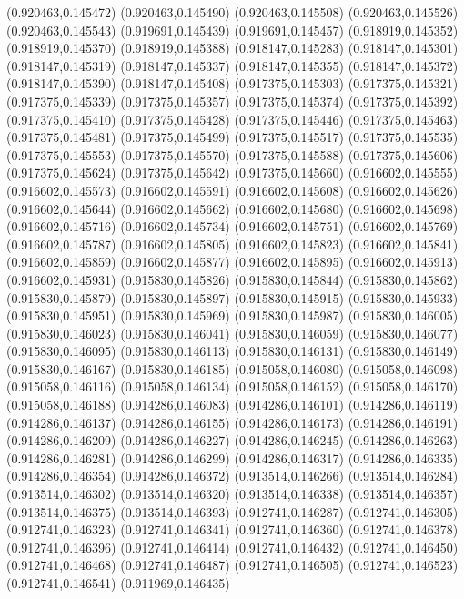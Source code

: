 (0.920463,0.145472)
(0.920463,0.145490)
(0.920463,0.145508)
(0.920463,0.145526)
(0.920463,0.145543)
(0.919691,0.145439)
(0.919691,0.145457)
(0.918919,0.145352)
(0.918919,0.145370)
(0.918919,0.145388)
(0.918147,0.145283)
(0.918147,0.145301)
(0.918147,0.145319)
(0.918147,0.145337)
(0.918147,0.145355)
(0.918147,0.145372)
(0.918147,0.145390)
(0.918147,0.145408)
(0.917375,0.145303)
(0.917375,0.145321)
(0.917375,0.145339)
(0.917375,0.145357)
(0.917375,0.145374)
(0.917375,0.145392)
(0.917375,0.145410)
(0.917375,0.145428)
(0.917375,0.145446)
(0.917375,0.145463)
(0.917375,0.145481)
(0.917375,0.145499)
(0.917375,0.145517)
(0.917375,0.145535)
(0.917375,0.145553)
(0.917375,0.145570)
(0.917375,0.145588)
(0.917375,0.145606)
(0.917375,0.145624)
(0.917375,0.145642)
(0.917375,0.145660)
(0.916602,0.145555)
(0.916602,0.145573)
(0.916602,0.145591)
(0.916602,0.145608)
(0.916602,0.145626)
(0.916602,0.145644)
(0.916602,0.145662)
(0.916602,0.145680)
(0.916602,0.145698)
(0.916602,0.145716)
(0.916602,0.145734)
(0.916602,0.145751)
(0.916602,0.145769)
(0.916602,0.145787)
(0.916602,0.145805)
(0.916602,0.145823)
(0.916602,0.145841)
(0.916602,0.145859)
(0.916602,0.145877)
(0.916602,0.145895)
(0.916602,0.145913)
(0.916602,0.145931)
(0.915830,0.145826)
(0.915830,0.145844)
(0.915830,0.145862)
(0.915830,0.145879)
(0.915830,0.145897)
(0.915830,0.145915)
(0.915830,0.145933)
(0.915830,0.145951)
(0.915830,0.145969)
(0.915830,0.145987)
(0.915830,0.146005)
(0.915830,0.146023)
(0.915830,0.146041)
(0.915830,0.146059)
(0.915830,0.146077)
(0.915830,0.146095)
(0.915830,0.146113)
(0.915830,0.146131)
(0.915830,0.146149)
(0.915830,0.146167)
(0.915830,0.146185)
(0.915058,0.146080)
(0.915058,0.146098)
(0.915058,0.146116)
(0.915058,0.146134)
(0.915058,0.146152)
(0.915058,0.146170)
(0.915058,0.146188)
(0.914286,0.146083)
(0.914286,0.146101)
(0.914286,0.146119)
(0.914286,0.146137)
(0.914286,0.146155)
(0.914286,0.146173)
(0.914286,0.146191)
(0.914286,0.146209)
(0.914286,0.146227)
(0.914286,0.146245)
(0.914286,0.146263)
(0.914286,0.146281)
(0.914286,0.146299)
(0.914286,0.146317)
(0.914286,0.146335)
(0.914286,0.146354)
(0.914286,0.146372)
(0.913514,0.146266)
(0.913514,0.146284)
(0.913514,0.146302)
(0.913514,0.146320)
(0.913514,0.146338)
(0.913514,0.146357)
(0.913514,0.146375)
(0.913514,0.146393)
(0.912741,0.146287)
(0.912741,0.146305)
(0.912741,0.146323)
(0.912741,0.146341)
(0.912741,0.146360)
(0.912741,0.146378)
(0.912741,0.146396)
(0.912741,0.146414)
(0.912741,0.146432)
(0.912741,0.146450)
(0.912741,0.146468)
(0.912741,0.146487)
(0.912741,0.146505)
(0.912741,0.146523)
(0.912741,0.146541)
(0.911969,0.146435)
